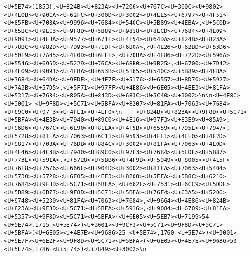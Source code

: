 \documentclass[
]{article}
\begin{document}
\begin{verbatim}
<U+5E74>(1853),<U+824B><U+823A><U+7206><U+767C><U+300C><U+9802><U+4E0B><U+90CA><U+62FC><U+300D><U+3002><U+4EE5><U+6797><U+4F51><U+85FB><U+70BA><U+9996><U+7684><U+540C><U+5B89><U+4EBA>,<U+5C0D><U+65BC><U+9EC3><U+9F8D><U+5B89><U+9818><U+8ECD><U+7684><U+4E09><U+9091><U+4EBA><U+9577><U+671F><U+4F54><U+64DA><U+824B><U+823A><U+78BC><U+982D><U+7D93><U+71DF><U+6B0A>,<U+4E26><U+62BD><U+53D6><U+50F9><U+7A05><U+4E0D><U+6EFF>,<U+70BA><U+4E86><U+722D><U+596A><U+5546><U+696D><U+5229><U+76CA><U+68B0><U+9B25>,<U+6700><U+7D42><U+4E09><U+9091><U+4EBA><U+653B><U+5165><U+540C><U+5B89><U+4EBA><U+7684><U+64DA><U+9EDE>,<U+4F7F><U+5176><U+6557><U+8D70><U+5927><U+7A3B><U+57D5>,<U+5F71><U+97FF><U+4E86><U+6E05><U+4EE3><U+81FA><U+5317><U+7684><U+805A><U+843D><U+683C><U+5C40><U+3002>\n\n<U+4E8C><U+3001> <U+9F8D><U+5C71><U+5BFA><U+8207><U+81FA><U+7063><U+7684><U+89C0><U+97F3><U+4FE1><U+4EF0>\n    <U+824B><U+823A><U+9F8D><U+5C71><U+5BFA><U+4E3B><U+7940><U+89C0><U+4E16><U+97F3><U+83E9><U+85A9>,<U+96D6><U+767C><U+6E90><U+81EA><U+4F5B><U+6559><U+795E><U+7947>,<U+5728><U+81FA><U+7063><U+6C11><U+9593><U+4FE1><U+4EF0><U+4E2D><U+9817><U+70BA><U+76DB><U+884C><U+3002><U+81FA><U+7063><U+4E0D><U+4F46><U+4E3B><U+7940><U+89C0><U+97F3><U+7684><U+5EDF><U+5B87><U+773E><U+591A>,<U+5728><U+5BB6><U+4F9B><U+5949><U+8005><U+4E5F><U+76F8><U+7576><U+666E><U+904D><U+3002><U+81FA><U+7063><U+5404><U+5730><U+5728><U+6E05><U+4EE3><U+8208><U+5EFA><U+5B8C><U+6210><U+7684><U+9F8D><U+5C71><U+5BFA>,<U+662F><U+7531><U+6CC9><U+5DDE><U+5B89><U+6D77><U+9F8D><U+5C71><U+5BFA><U+76F4><U+63A5><U+5206><U+9748><U+5230><U+81FA><U+7063><U+7684>,<U+9664><U+4E86><U+824B><U+823A><U+9F8D><U+5C71><U+5BFA><U+5916>,<U+9084><U+6709><U+81FA><U+5357><U+9F8D><U+5C71><U+5BFA>(<U+6E05><U+5EB7><U+7199>54 <U+5E74>,1715 <U+5E74>)<U+3001><U+9CF3><U+5C71><U+9F8D><U+5C71><U+5BFA>(<U+6E05><U+4E7E><U+9686>25 <U+5E74>,1760 <U+5E74>)<U+3001><U+9E7F><U+6E2F><U+9F8D><U+5C71><U+5BFA>(<U+6E05><U+4E7E><U+9686>50 <U+5E74>,1786 <U+5E74>)<U+7B49><U+3002>\n    
\end{verbatim}
\end{document}
